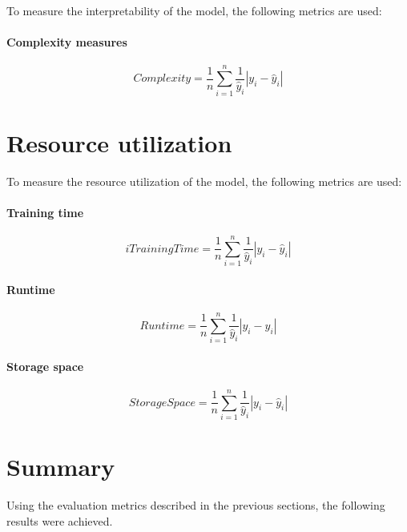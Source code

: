 To measure the interpretability of the model, the following metrics are used:

\paragraph*{Complexity measures}

\begin{equation}
    \label{eq:complexity}
    Complexity = \frac{1}{n} \sum_{i=1}^{n} \frac{1}{\hat{y}_i} |y_i - \hat{y}_i|
\end{equation}

\section{Resource utilization}

To measure the resource utilization of the model, the following metrics are used:

\paragraph*{Training time}

\begin{equation}i
    \label{eq:training_time}
    Training Time = \frac{1}{n} \sum_{i=1}^{n} \frac{1}{\hat{y}_i} |y_i - \hat{y}_i|
\end{equation}

\paragraph*{Runtime}

\begin{equation}
    \label{eq:runtime}
    Runtime = \frac{1}{n} \sum_{i=1}^{n} \frac{1}{\hat{y}_i} |y_i - \hat{y}_i|
\end{equation}

\paragraph*{Storage space}

\begin{equation}
    \label{eq:storage_space}
    Storage Space = \frac{1}{n} \sum_{i=1}^{n} \frac{1}{\hat{y}_i} |y_i - \hat{y}_i|
\end{equation}

\section{Summary}
Using the evaluation metrics described in the previous sections, the following results were achieved.
